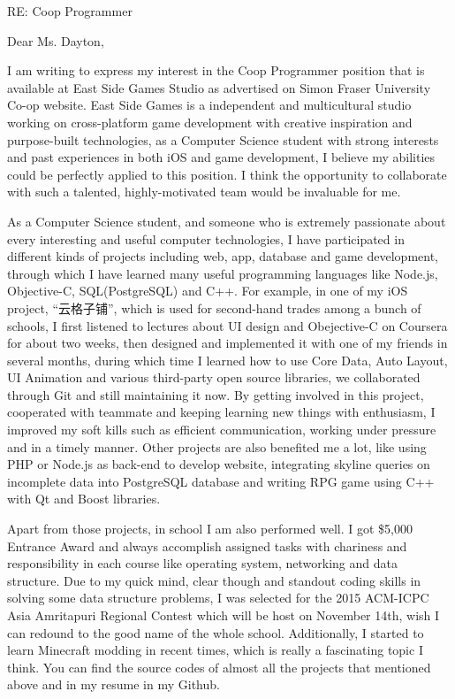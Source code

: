 \documentclass[10pt]{article} %
\begin{document}
RE: Coop Programmer

\vspace{4mm}

Dear Ms. Dayton,

\vspace{4mm}

I am writing to express my interest in the Coop Programmer position that is available at East Side Games Studio as advertised on Simon Fraser University Co-op website. East Side Games is a independent and multicultural studio working on cross-platform game development with creative inspiration and purpose-built technologies, as a Computer Science student with strong interests and past experiences in both iOS and game development, I believe my abilities could be perfectly applied to this position. I think the opportunity to collaborate with such a talented, highly-motivated team would be invaluable for me.

\vspace{4mm}

As a Computer Science student, and someone who is extremely passionate about every interesting and useful computer technologies, I have participated in different kinds of projects including web, app, database and game development, through which I have learned many useful programming languages like Node.js, Objective-C, SQL(PostgreSQL) and C++. For example, in one of my iOS project, ``云格子铺'', which is used for second-hand trades among a bunch of schools, I first listened to lectures about UI design and Obejective-C on Coursera for about two weeks, then designed and implemented it with one of my friends in several months, during which time I learned how to use Core Data, Auto Layout, UI Animation and various third-party open source libraries, we collaborated through Git and still maintaining it now. By getting involved in this project, cooperated with teammate and keeping learning new things with enthusiasm, I improved my soft kills such as efficient communication, working under pressure and in a timely manner. Other projects are also benefited me a lot, like using PHP or Node.js as back-end to develop website, integrating skyline queries on incomplete data into PostgreSQL database and writing RPG game using C++ with Qt and Boost libraries.

\vspace{4mm}

Apart from those projects, in school I am also performed well. I got \$5,000 Entrance Award and always accomplish assigned tasks with chariness and responsibility in each course like operating system, networking and data structure. Due to my quick mind, clear though and standout coding skills in solving some data structure problems, I was selected for the 2015 ACM-ICPC Asia Amritapuri Regional Contest which will be host on November 14th, wish I can redound to the good name of the whole school. Additionally, I started to learn Minecraft modding in recent times, which is really a fascinating topic I think. You can find the source codes of almost all the projects that mentioned above and in my resume in my Github.
\end{document}
